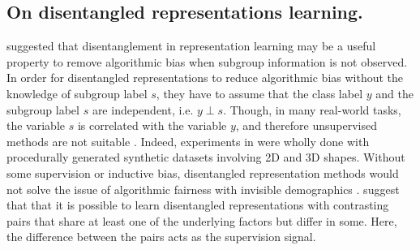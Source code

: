 \subsection{On disentangled representations learning.}%
\label{ssec:on-disentangled-representation-learning}
\citet{locatello2019fairness} suggested that disentanglement in representation learning may be a useful property to remove algorithmic bias when subgroup information is not observed.
%
In order for disentangled representations to reduce algorithmic bias without the knowledge of subgroup label $s$, they have to assume that the class label $y$ and the subgroup label $s$ are independent, i.e. $y\perp s$.
%
Though, in many real-world tasks, the variable $s$ is correlated with the variable $y$, and therefore unsupervised methods are not suitable  \citep{jaiswal2018unsupervised,JaiWuAbdNat19}. 
%
Indeed, experiments in \citet{locatello2019fairness} were wholly done with procedurally generated synthetic datasets involving 2D and 3D shapes. 
%
Without some supervision or inductive bias, disentangled representation methods would not solve the issue of algorithmic fairness with invisible demographics \citep{locatello2019challenging}. 
\citet{locatello2020weakly} suggest that that it is possible to learn disentangled representations
with contrasting pairs that share at least one of the underlying factors but differ in some.
Here, the difference between the pairs acts as the supervision signal.

